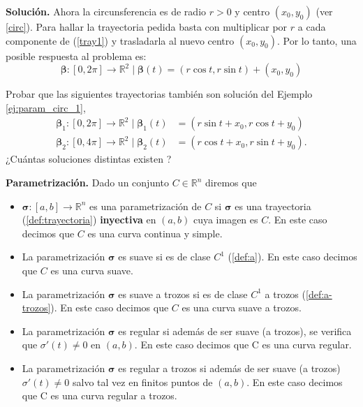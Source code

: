 \textbf{Soluci\'on. } Ahora la circunsferencia es de radio $r> 0$ y centro $(x_0,y_0)$  (ver \ref{circ}). Para hallar la trayectoria pedida basta con multiplicar por $r$ a cada componente de (\ref{tray1})  y trasladarla al nuevo centro $(x_0,y_0)$.  Por lo tanto,  una posible respuesta al problema es:
\begin{equation*}
            \boldsymbol{\beta}:[0,2\pi] \rightarrow \mathbb{R}^2  \;|\;  \boldsymbol{\beta}(t)=(r\cos{t},r\sin{t}) + (x_0,y_0)
\end{equation*} 
         
 
 \begin{tarea}\label{obs2} Probar que las siguientes  trayectorias   tambi\'en  son solución del Ejemplo \ref{ej:param_circ_1}, 
\begin{align*}
 \boldsymbol{\beta}_{1}:[0,2\pi]\rightarrow\mathbb{R}^2\;|\;\boldsymbol{\beta}_{1}(t)&=(r\sin{t}+x_0,r\cos{t}+y_0 )  \\  
 \boldsymbol{\beta}_{2}:[0,4\pi]\rightarrow\mathbb{R}^2\;|\;\boldsymbol{\beta}_{2}(t)&=(r\cos{t}+x_0, r\sin{t}+y_0 ).
\end{align*}  ¿Cu\'antas  soluciones distintas existen ? 
 \end{tarea}       
     
     

    
    
\begin{definition}{\textbf{Parametrizaci\'on.}}\label{param}  Dado un conjunto $C \in \mathbb{R}^{n}$ diremos  que

\begin{itemize}

\item[a.]  $\boldsymbol{\sigma}: [a,b] \rightarrow\mathbb{R}^n$  es una parametrizaci\'on de $C$ si 
 $\boldsymbol{\sigma}$ es una trayectoria (\ref{def:trayectoria}) \textbf{ inyectiva } en $(a,b)$   cuya imagen es $C$. En este caso decimos que
$C$ es una curva continua y simple.

\item[b.] La parametrizaci\'on  $\boldsymbol{\sigma}$ es suave si  es de clase $C^{1}$   (\ref{def:a}). En este caso decimos que
$C$ es una curva  suave. 

\item[c.] La parametrizaci\'on  $\boldsymbol{\sigma}$ es suave a trozos si  es de clase $C^{1}$ a trozos (\ref{def:a-trozos}). En este caso decimos que
$C$ es una curva  suave a trozos. 

 \item[d.] La parametrización  $\boldsymbol{\sigma}$  es regular si además de ser suave (a trozos), se verifica que
 $\sigma'(t)\neq 0$  en  $(a,b)$.  En este caso decimos que C es una curva regular.
 
\item[e.]  La parametrización  $\boldsymbol{\sigma}$  es regular a trozos  si además de ser suave (a trozos)  $\sigma'(t)\neq 0$  salvo tal vez en finitos puntos de $(a,b)$.  En este caso decimos que C es una curva regular a trozos.
\end{itemize}
\end{definition} 


